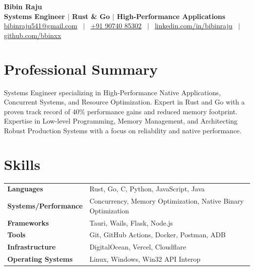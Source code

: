 \documentclass[a4paper,10pt]{article}
\begin{document}
\pagestyle{empty}

\begin{center}
{\LARGE \textbf{Bibin Raju}}\\[3pt]
\textbf{Systems Engineer $|$ Rust \& Go $|$ High-Performance Applications}\\[3pt]
\href{mailto:bibinraju541@gmail.com}{bibinraju541@gmail.com}
~$|$~
\href{tel:+919074085302}{+91 90740 85302}
~$|$~
\href{https://www.linkedin.com/in/bibinraju/}{linkedin.com/in/bibinraju}
~$|$~
\href{https://github.com/bbinxx}{github.com/bbinxx}
\end{center}

\vspace{-5pt}

\section*{Professional Summary}

Systems Engineer specializing in High-Performance Native Applications, Concurrent Systems, and Resource Optimization. Expert in Rust and Go with a proven track record of 40\% performance gains and reduced memory footprint. Expertise in Low-level Programming, Memory Management, and Architecting Robust Production Systems with a focus on reliability and native performance.

\section*{Skills}

\renewcommand{\arraystretch}{1.0}
\begin{tabular}{@{} >{\bfseries}p{3.8cm} p{13cm} @{}}
Languages           & Rust, Go, C, Python, JavaScript, Java \\
Systems/Performance & Concurrency, Memory Optimization, Native Binary Optimization \\
Frameworks          & Tauri, Wails, Flask, Node.js \\
Tools               & Git, GitHub Actions, Docker, Postman, ADB \\
Infrastructure      & DigitalOcean, Vercel, Cloudflare \\
Operating Systems   & Linux, Windows, Win32 API Interop \\
\end{tabular}
\end{document}
